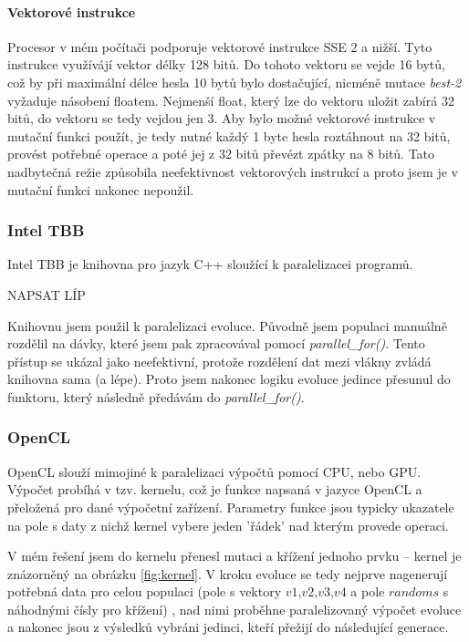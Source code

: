 \documentclass[11pt,a4paper]{scrartcl}
\begin{document}
	\paragraph{Vektorové instrukce} Procesor v mém počítači podporuje vektorové instrukce SSE 2 a nižší. Tyto instrukce využívájí vektor délky 128 bitů. Do tohoto vektoru se vejde 16 bytů, což by při maximální délce hesla 10 bytů bylo dostačující, nicméně mutace \textit{best-2} vyžaduje násobení floatem. Nejmenší float, který lze do vektoru uložit zabírá 32 bitů, do vektoru se tedy vejdou jen 3. Aby bylo možné vektorové instrukce v mutační funkci použít, je tedy nutné každý 1 byte hesla roztáhnout na 32 bitů, provést potřebné operace a poté jej z 32 bitů převézt zpátky na 8 bitů. Tato nadbytečná režie způsobila neefektivnost vektorových instrukcí a proto jsem je v mutační funkci nakonec nepoužil.

	\subsubsection{Intel TBB}
	Intel TBB je knihovna pro jazyk C++ sloužící k paralelizacei programů.
	
	NAPSAT LÍP
	
	 Knihovnu jsem použil k paralelizaci evoluce. Původně jsem populaci manuálně rozdělil na dávky, které jsem pak zpracovával pomocí \textit{parallel\_for()}. Tento přístup se ukázal jako neefektivní, protože rozdělení dat mezi vlákny zvládá knihovna sama (a lépe). Proto jsem nakonec logiku evoluce jedince přesunul do funktoru, který následně předávám do \textit{parallel\_for()}.
	
	\subsubsection{OpenCL}
	OpenCL slouží mimojiné k paralelizaci výpočtů pomocí CPU, nebo GPU. Výpočet probíhá v tzv. kernelu, což je funkce napsaná v jazyce OpenCL a přeložená pro dané výpočetní zařízení. Parametry funkce jsou typicky ukazatele na pole s daty z nichž kernel vybere jeden 'řádek' nad kterým provede operaci.
	
	V mém řešení jsem do kernelu přenesl mutaci a křížení jednoho prvku -- kernel je znázorněný na obrázku \ref{fig:kernel}. V kroku evoluce se tedy nejprve nagenerují potřebná data pro celou populaci (pole s vektory $v1$,$v2$,$v3$,$v4$ a pole $randoms$ s náhodnými čísly pro křížení) , nad nimi proběhne paralelizovaný výpočet evoluce a nakonec jsou z výsledků vybráni jedinci, kteří přežijí do následující generace. 
	
\end{document}
